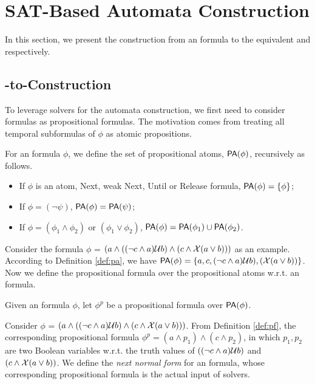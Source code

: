 \section{SAT-Based Automata Construction}

In this section, we present the construction from an \ltlf formula to the equivalent \NFA and \DFA respectively. 


\subsection{\ltlf-to-\NFA Construction}

To leverage \SAT solvers for the automata construction, we first need to consider \ltlf formulas as propositional formulas. The motivation comes from treating all temporal subformulas of $\phi$ as atomic propositions. 

\begin{definition}\label{def:pa}
For an \ltlf formula $\phi$, we define the set of propositional atoms, ${\sf PA}(\phi)$, recursively as follows.
\begin{itemize}
	\item If $\phi$ is an atom, Next, weak Next, Until or Release formula, ${\sf PA}(\phi)=\{\phi\}$;
	\item If $\phi = (\neg \psi)$, ${\sf PA}(\phi)= {\sf PA}(\psi)$;
	\item If $\phi = (\phi_1 \wedge \phi_2)$ or $(\phi_1 \vee \phi_2)$, ${\sf PA}(\phi) = {\sf PA}(\phi_1) \cup {\sf PA}(\phi_2)$.
\end{itemize}
\end{definition}

Consider the formula $\phi$ = $(a \wedge ((\neg c \wedge a)\mathcal{U} b) \wedge (c \wedge \mathcal{X} (a \vee b)))$ as an example. According to Definition \ref{def:pa}, we have ${\sf PA}(\phi)=\{a, c, (\neg c \wedge a)\mathcal{U} b), (\mathcal{X} (a \vee b))\}$. Now we define the propositional formula over the propositional atoms w.r.t. an \ltlf formula.

\begin{definition}\label{def:pf}
Given an \ltlf formula $\phi$, let $\phi^{p}$ be a propositional formula over ${\sf PA}(\phi)$. 
\end{definition}

Consider $\phi$ = $(a \wedge ((\neg c \wedge a)\mathcal{U} b) \wedge (c \wedge \mathcal{X} (a \vee b)))$. From Definition \ref{def:pf}, the corresponding propositional formula $\phi^p = (a \wedge p_1) \wedge (c \wedge p_2)$, in which $p_1, p_2$ are two Boolean variables w.r.t. the truth values of $((\neg c \wedge a)\mathcal{U} b)$ and $(c \wedge \mathcal{X} (a \vee b))$. We define the \emph{next normal form} for an \ltlf formula, whose corresponding propositional formula is the actual input of \SAT solvers.

